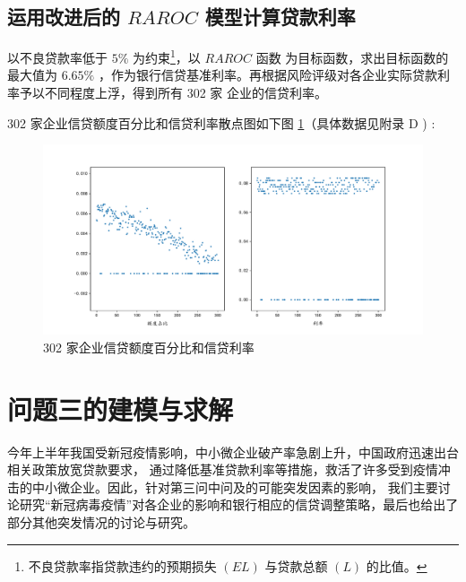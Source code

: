 \documentclass[withoutpreface,bwprint]{cumcmthesis}
\begin{document}
    \subsection{运用改进后的 $RAROC$ 模型计算贷款利率}
        以不良贷款率低于 $ 5 \%$ 为约束\footnote{不良贷款率指贷款违约的预期损失 $(EL)$ 与贷款总额 $(L)$ 的比值。}，以 $RAROC$ 函数
        为目标函数，求出目标函数的最大值为 $ 6.65 \%$ ，作为银行信贷基准利率。再根据风险评级对各企业实际贷款利率予以不同程度上浮，得到所有 302 家
        企业的信贷利率。\par
        302 家企业信贷额度百分比和信贷利率散点图如下图 \ref{图：2-2}（具体数据见附录 D ) :
        \begin{figure}[H]
            \centering
            \includegraphics[width = 1.0\textwidth]{2_2.pdf}
            \caption{302 家企业信贷额度百分比和信贷利率}
            \label {图：2-2}
        \end{figure}
    
    \section{问题三的建模与求解}
        今年上半年我国受新冠疫情影响，中小微企业破产率急剧上升，中国政府迅速出台相关政策放宽贷款要求，
        通过降低基准贷款利率等措施，救活了许多受到疫情冲击的中小微企业。因此，针对第三问中问及的可能突发因素的影响，
        我们主要讨论研究``新冠病毒疫情''对各企业的影响和银行相应的信贷调整策略，最后也给出了部分其他突发情况的讨论与研究。
\end{document}
